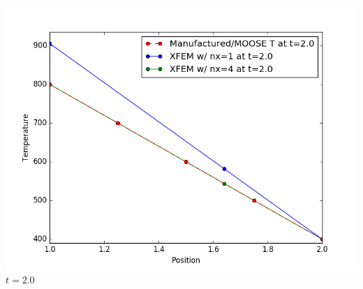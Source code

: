 \documentclass[]{beamer}
\begin{document}
\begin{frame}[t]
\begin{columns}
\begin{center}
			\includegraphics[scale=0.17]{figures/1D_rz_homog1mat_u_vs_x_20}\\
			$t=2.0$
			\end{center}
	\end{columns}
\end{frame}
\end{document}
